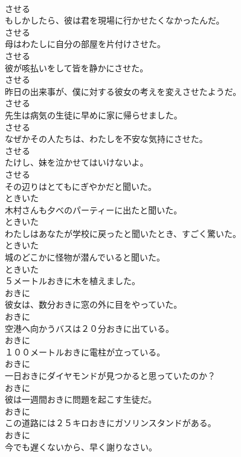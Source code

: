 \documentclass[8pt]{extreport}
\begin{document}
\begin{CJK}{UTF8}{min}
\\	させる
\\	もしかしたら、彼は君を現場に行かせたくなかったんだ。	
\\	させる
\\	母はわたしに自分の部屋を片付けさせた。	
\\	させる
\\	彼が咳払いをして皆を静かにさせた。	
\\	させる
\\	昨日の出来事が、僕に対する彼女の考えを変えさせたようだ。	
\\	させる
\\	先生は病気の生徒に早めに家に帰らせました。	
\\	させる
\\	なぜかその人たちは、わたしを不安な気持にさせた。	
\\	させる
\\	たけし、妹を泣かせてはいけないよ。	
\\	させる
\\	その辺りはとてもにぎやかだと聞いた。	
\\	ときいた
\\	木村さんも夕べのパーティーに出たと聞いた。	
\\	ときいた
\\	わたしはあなたが学校に戻ったと聞いたとき、すごく驚いた。	
\\	ときいた
\\	城のどこかに怪物が潜んでいると聞いた。	
\\	ときいた
\\	５メートルおきに木を植えました。	
\\	おきに
\\	彼女は、数分おきに窓の外に目をやっていた。	
\\	おきに
\\	空港へ向かうバスは２０分おきに出ている。	
\\	おきに
\\	１００メートルおきに電柱が立っている。	
\\	おきに
\\	一日おきにダイヤモンドが見つかると思っていたのか？	
\\	おきに
\\	彼は一週間おきに問題を起こす生徒だ。	
\\	おきに
\\	この道路には２５キロおきにガソリンスタンドがある。	
\\	おきに
\\	今でも遅くないから、早く謝りなさい。	

\end{CJK}
\end{document}
